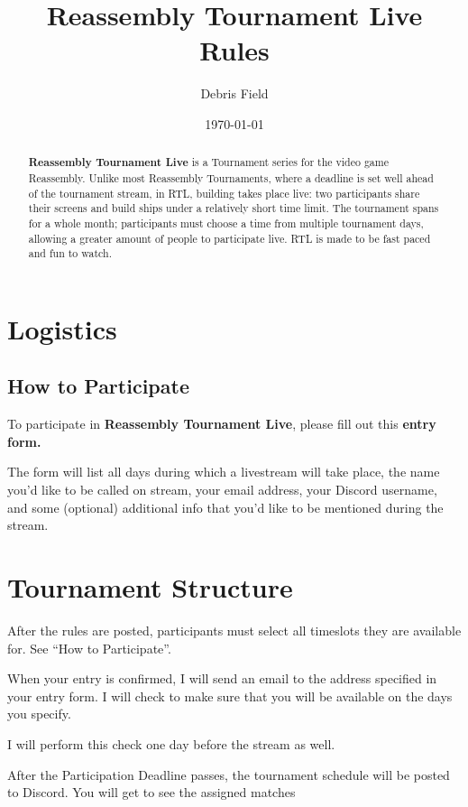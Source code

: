\documentclass[11pt]{article}
\newcommand{\RTL}{\textbf{Reassembly Tournament Live}}
\begin{document}
\title{Reassembly Tournament Live Rules}
\author{Debris Field}
\date{\today}
\maketitle

\begin{abstract}
\RTL{} is a Tournament
series for the video game Reassembly. Unlike most Reassembly Tournaments, where
a deadline is set well ahead of the tournament stream, in RTL,
building takes place live: two participants share their screens and
build ships under a relatively short time limit. The tournament spans
for a whole month; participants must choose a time from multiple
tournament days, allowing a greater amount of people to participate live.
RTL is made to be fast paced and fun to watch.
\end{abstract}

\tableofcontents

\section{Logistics}
\subsection{How to Participate}
To participate in \RTL{}, please fill out this \textbf{entry form.}

The form will list all days during which a livestream will take place, the name you'd like to
be called on stream, your email address, your Discord username, and 
some (optional) additional info that you'd like to be mentioned during the stream.

\section{Tournament Structure}
After the rules are posted, participants must select all timeslots they are available for.
See ``How to Participate''.

When your entry is confirmed, I will send an email to the address specified in your entry form.
I will check to make sure that you will be available on the days you specify.

I will perform this check one day before the stream as well.

After the Participation Deadline passes, the tournament schedule will be posted to Discord.
You will get to see the assigned matches 
\end{document}
